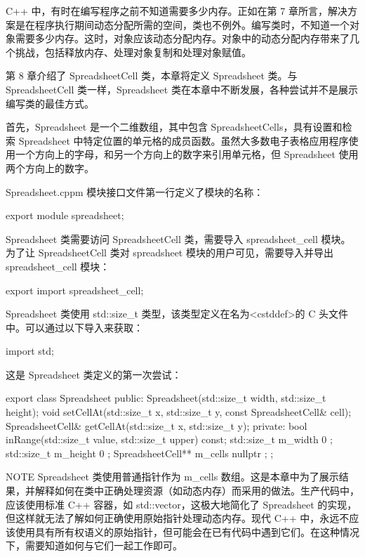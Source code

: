 
C++ 中，有时在编写程序之前不知道需要多少内存。正如在第 7 章所言，解决方案是在程序执行期间动态分配所需的空间，类也不例外。编写类时，不知道一个对象需要多少内存。这时，对象应该动态分配内存。对象中的动态分配内存带来了几个挑战，包括释放内存、处理对象复制和处理对象赋值。


第 8 章介绍了 SpreadsheetCell 类，本章将定义 Spreadsheet 类。与 SpreadsheetCell 类一样，Spreadsheet 类在本章中不断发展，各种尝试并不是展示编写类的最佳方式。

首先，Spreadsheet 是一个二维数组，其中包含 SpreadsheetCells，具有设置和检索 Spreadsheet 中特定位置的单元格的成员函数。虽然大多数电子表格应用程序使用一个方向上的字母，和另一个方向上的数字来引用单元格，但 Spreadsheet 使用两个方向上的数字。

Spreadsheet.cppm 模块接口文件第一行定义了模块的名称：

\begin{cpp}
export module spreadsheet;
\end{cpp}

Spreadsheet 类需要访问 SpreadsheetCell 类，需要导入 spreadsheet\_cell 模块。为了让 SpreadsheetCell 类对 spreadsheet 模块的用户可见，需要导入并导出 spreadsheet\_cell 模块：

\begin{cpp}
export import spreadsheet_cell;
\end{cpp}

Spreadsheet 类使用 std::size\_t 类型，该类型定义在名为<cstddef>的 C 头文件中。可以通过以下导入来获取：

\begin{cpp}
import std;
\end{cpp}

这是 Spreadsheet 类定义的第一次尝试：

\begin{cpp}
export class Spreadsheet
{
    public:
        Spreadsheet(std::size_t width, std::size_t height);
        void setCellAt(std::size_t x, std::size_t y, const SpreadsheetCell& cell);
        SpreadsheetCell& getCellAt(std::size_t x, std::size_t y);
    private:
        bool inRange(std::size_t value, std::size_t upper) const;
        std::size_t m_width { 0 };
        std::size_t m_height { 0 };
        SpreadsheetCell** m_cells { nullptr };
};
\end{cpp}

\begin{myNotic}{NOTE}
Spreadsheet 类使用普通指针作为 m\_cells 数组。这是本章中为了展示结果，并解释如何在类中正确处理资源（如动态内存）而采用的做法。生产代码中，应该使用标准 C++ 容器，如 std::vector，这极大地简化了 Spreadsheet 的实现，但这样就无法了解如何正确使用原始指针处理动态内存。现代 C++ 中，永远不应该使用具有所有权语义的原始指针，但可能会在已有代码中遇到它们。在这种情况下，需要知道如何与它们一起工作即可。
\end{myNotic}

